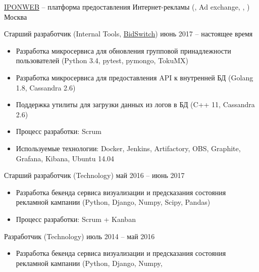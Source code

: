 \documentclass[unicode, 10pt, a4paper, oneside, fleqn]{article}
\begin{document}
\job  %
    {\href{http://www.iponweb.com}{IPONWEB} -- платформа предоставления
     Интернет-рекламы (, Ad exchange, , )}
    {Москва}
    {
        \position  %
            {Старший разработчик (Internal Tools, \href{http://www.bidswitch.com/}{BidSwitch})}
            {июнь 2017 -- настоящее время}
            {
                \begin{itemize}
                    \item{Разработка микросервиса для обновления групповой
                          принадлежности пользователей
                          (Python 3.4, pytest, pymongo, TokuMX)}
                    \item{Разработка микросервиса для предоставления API к
                          внутренней БД (Golang 1.8, Cassandra 2.6)}
                    \item{Поддержка утилиты для загрузки данных из логов в БД
                          (C++ 11, Cassandra 2.6)}
                    \item{Процесс разработки: Scrum}
                    \item{Используемые технологии: Docker, Jenkins, Artifactory,
                          OBS, Graphite, Grafana, Kibana, Ubuntu 14.04}
                \end{itemize}
            }
        \position  %
            {Старший разработчик (Technology)}
            {май 2016 -- июнь 2017}
            {
                \begin{itemize}
                    \item{Разработка бекенда сервиса визуализации и предсказания
                          состояния рекламной кампании (Python, Django, Numpy,
                          Scipy, Pandas)}
                    \item{Процесс разработки: Scrum + Kanban}
                \end{itemize}
            }
        \position  %
            {Разработчик (Technology)}
            {июль 2014 -- май 2016}
            {
                \begin{itemize}
                    \item{Разработка бекенда сервиса визуализации и предсказания
                          состояния рекламной кампании (Python, Django, Numpy,
}
\end{itemize}}}
\end{document}

